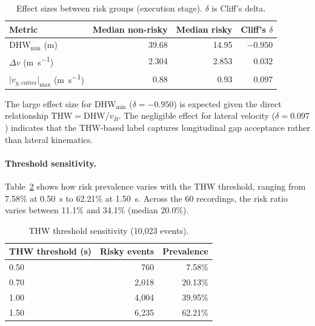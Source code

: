 \documentclass[12pt,a4paper,twoside,openright]{report}
\begin{document}
    \begin{table}[H]
        \centering
        \caption{Effect sizes between risk groups (execution stage). $\delta$ is Cliff's delta.}
        \label{tab:effect-sizes}
        \begin{tabular}{@{}lrrr@{}}
            \toprule
            Metric & Median non-risky & Median risky & Cliff's $\delta$ \\
            \midrule
            DHW$_{\min}$ (\si{\meter}) & 39.68 & 14.95 & $-0.950$ \\
            $\Delta v$ (\si{\meter\per\second}) & 2.304 & 2.853 & $0.032$ \\
            $\lvert v_{y,\text{cutter}}\rvert_{\max}$ (\si{\meter\per\second}) & 0.88 & 0.93 & $0.097$ \\
            \bottomrule
        \end{tabular}
    \end{table}

    The large effect size for DHW$_{\min}$ ($\delta = -0.950$) is expected given the direct relationship $\mathrm{THW}=\mathrm{DHW}/v_B$. The negligible effect for lateral velocity ($\delta = 0.097$) indicates that the THW-based label captures longitudinal gap acceptance rather than lateral kinematics.

    \paragraph{Threshold sensitivity.}
    Table~\ref{tab:sensitivity} shows how risk prevalence varies with the THW threshold, ranging from 7.58\% at \SI{0.50}{\second} to 62.21\% at \SI{1.50}{\second}. Across the 60 recordings, the risk ratio varies between 11.1\% and 34.1\% (median 20.0\%).

    \begin{table}[H]
        \centering
        \caption{THW threshold sensitivity (10,023 events).}
        \label{tab:sensitivity}
        \begin{tabular}{@{}lrr@{}}
            \toprule
            THW threshold (s) & Risky events & Prevalence \\
            \midrule
            0.50 & 760 & 7.58\% \\
            0.70 & 2,018 & 20.13\% \\
            1.00 & 4,004 & 39.95\% \\
            1.50 & 6,235 & 62.21\% \\
            \bottomrule
        \end{tabular}
    \end{table}
\end{document}
